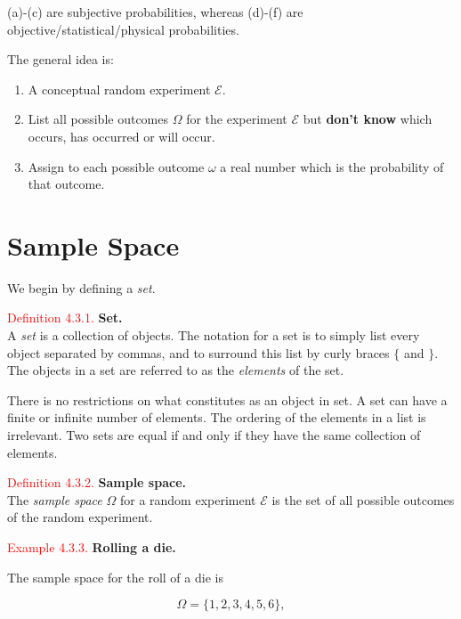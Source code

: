\documentclass[
]{book}
\providecommand{\tightlist}{%
  \setlength{\itemsep}{0pt}\setlength{\parskip}{0pt}}
\begin{document}
(a)-(c) are subjective probabilities, whereas (d)-(f) are objective/statistical/physical probabilities.

The general idea is:

\begin{enumerate}
\def\labelenumi{(\alph{enumi})}
\tightlist
\item
  A conceptual random experiment \(\mathcal{E}\).\\
\item
  List all possible outcomes \(\Omega\) for the experiment \(\mathcal{E}\) but \textbf{don't know} which occurs, has occurred or will occur.\\
\item
  Assign to each possible outcome \(\omega\) a real number which is the probability of that outcome.
\end{enumerate}

\hypertarget{prob:sample_space}{%
\section{Sample Space}\label{prob:sample_space}}

We begin by defining a \emph{set}.

\leavevmode{}%
\textcolor{red}{Definition 4.3.1.}
{\textbf{Set.}}\\
A \emph{set} is a collection of objects. The notation for a set is to simply list every object separated by commas, and to surround this list by curly braces \(\{\) and \(\}\). The objects in a set are referred to as the \emph{elements} of the set.

There is no restrictions on what constitutes as an object in set. A set can have a finite or infinite number of elements. The ordering of the elements in a list is irrelevant. Two sets are equal if and only if they have the same collection of elements.

\leavevmode{}%
\textcolor{red}{Definition 4.3.2.}
{\textbf{Sample space.}}\\
The \emph{sample space} \(\Omega\) for a random experiment \(\mathcal{E}\) is the set of all possible outcomes of the random experiment.

\leavevmode{}%
\textcolor{red}{Example 4.3.3.}
{\textbf{Rolling a die.}}

The sample space for the roll of a die is

\[\Omega = \{ 1,2,3,4,5,6 \},\]
\end{document}
